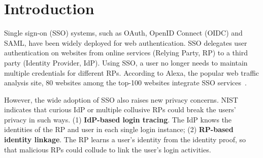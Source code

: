 \section{Introduction}
\label{sec:intro}
Single sign-on (SSO) systems, such as OAuth, OpenID Connect (OIDC) and SAML, have been widely deployed for web authentication.
SSO delegates user authentication on websites from online services (Relying Party, RP) to a third party (Identity Provider, IdP).
Using SSO, a user no longer needs to maintain multiple credentials for different RPs.
According to Alexa, the popular web traffic analysis site, 80 websites among the top-100 websites integrate SSO services~\cite{Alexa}.

However, the wide adoption of SSO also raises new privacy concerns. 
NIST~\cite{NIST2017draft} indicates that curious IdP or multiple collusive RPs could break the users' privacy in such ways. (1) \textbf{IdP-based login tracing}. The IdP knows the identities of the RP and user in each single login instance; (2) \textbf{RP-based identity linkage}. The RP learns a user's identity from the identity proof, so that malicious RPs could collude to link the user's login activities.
\begin{comment}
\item {\em IdP-based login tracing}. The IdP knows the identities of the RP and user in each single login instance.
\item {\em RP-based identity linkage}. The RP learns a user's identity from the identity proof, so that malicious RPs could collude to link the user's login activities.
\end{comment}

